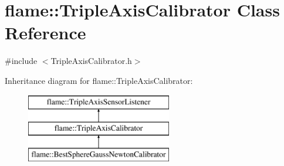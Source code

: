 \hypertarget{classflame_1_1_triple_axis_calibrator}{\section{flame\-:\-:Triple\-Axis\-Calibrator Class Reference}
\label{classflame_1_1_triple_axis_calibrator}
}


{\ttfamily \#include $<$Triple\-Axis\-Calibrator.\-h$>$}

Inheritance diagram for flame\-:\-:Triple\-Axis\-Calibrator\-:\begin{figure}[H]
\begin{center}
\leavevmode
\includegraphics[height=3.000000cm]{classflame_1_1_triple_axis_calibrator}
\end{center}
\end{figure}
